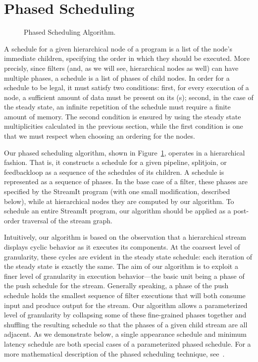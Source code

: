 \section{Phased Scheduling}
\label{chpt:phased}

\begin{figure}[t]
\vspace{-12pt}
\caption{\small Phased Scheduling Algorithm.\protect\label{fig:phasealg}}
\end{figure}

A schedule for a given hierarchical node of a {\StreamIt} program is a
list of the node's immediate children, specifying the order in which
they should be executed.  More precisly, since filters (and, as we
will see, hierarchical nodes as well) can have multiple phases, a
schedule is a list of phases of child nodes.  In order for a schedule
to be legal, it must satisfy two conditions: first, for every
execution of a node, a sufficient amount of data must be present on
its {\Input} {\Channel}(s); second, in the case of the steady state,
an infinite repetition of the schedule must require a finite amount of
memory.  The second condition is ensured by using the steady state
multiplicities calculated in the previous section, while the first
condition is one that we must respect when choosing an ordering for
the nodes.

Our phased scheduling algorithm, shown in Figure~\ref{fig:phasealg},
operates in a hierarchical fashion.  That is, it constructs a schedule
for a given pipeline, splitjoin, or feedbackloop as a sequence of the
schedules of its children.  A schedule is represented as a sequence of
phases.  In the base case of a filter, these phases are specified by
the StreamIt program (with one small modification, described below),
while at hierarchical nodes they are computed by our algorithm.  To
schedule an entire StreamIt program, our algorithm should be applied
as a post-order traversal of the stream graph.

Intuitively, our algorithm is based on the observation that a
hierarchical stream displays cyclic behavior as it executes its
components.  At the coarsest level of granularity, these cycles are
evident in the steady state schedule: each iteration of the steady
state is exactly the same.  The aim of our algorithm is to exploit a
finer level of granularity in execution behavior---the basic unit
being a phase of the push schedule for the stream.  Generally
speaking, a phase of the push schedule holds the smallest sequence of
filter executions that will both consume input and produce output for
the stream.  Our algorithm allows a parameterized level of granularity
by collapsing some of these fine-grained phases together and shuffling
the resulting schedule so that the phases of a given child stream are
all adjacent.  As we demonstrate below, a single appearance schedule
and minimum latency schedule are both special cases of a parameterized
phased schedule.  For a more mathematical description of the phased
scheduling technique, see~\cite{karczma-thesis}.

